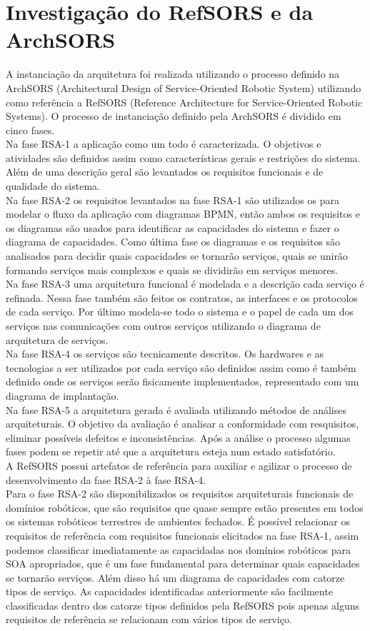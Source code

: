 \documentclass{article}
\begin{document}
\section{Investigação do RefSORS e da ArchSORS}
A instanciação da arquitetura foi realizada utilizando o processo definido na ArchSORS (Architectural Design of Service-Oriented Robotic System) utilizando como referência a RefSORS (Reference Architecture for Service-Oriented Robotic Systems). O processo de instanciação definido pela ArchSORS é dividido em cinco fases.\\
Na fase RSA-1 a aplicação como um todo é caracterizada. O objetivos e atividades são definidos assim como características gerais e restrições do sistema. Além de uma descrição geral são levantados os requisitos funcionais e de qualidade do sistema.\\
Na fase RSA-2 os requisitos levantados na fase RSA-1 são utilizados os para modelar o fluxo da aplicação com diagramas BPMN, então ambos os requisitos e os diagramas são usados para identificar as capacidades do sistema e fazer o diagrama de capacidades. Como última fase os diagramas e os requisitos são analisados para decidir quais capacidades se tornarão serviços, quais se unirão formando serviços mais complexos e quais se dividirão em serviços menores.\\
Na fase RSA-3 uma arquitetura funcional é modelada e a descrição cada serviço é refinada. Nessa fase também são feitos os contratos, as interfaces e os protocolos de cada serviço. Por último modela-se todo o sistema e o papel de cada um dos serviços nas comunicações com outros serviços utilizando o diagrama de arquitetura de serviços.\\
Na fase RSA-4 os serviços são tecnicamente descritos. Os hardwares e as tecnologias a ser utilizados por cada serviço são definidos assim como é também definido onde os serviços serão fisicamente implementados, representado com um diagrama de implantação.\\
Na fase RSA-5 a arquitetura gerada é avaliada utilizando métodos de análises arquiteturais. O objetivo da avaliação é analisar a conformidade com resquisitos, eliminar possíveis defeitos e inconsistências. Após a análise o processo algumas fases podem se repetir até que a arquitetura esteja num estado satisfatório.\\
A RefSORS possui artefatos de referência para auxiliar e agilizar o processo de desenvolvimento da fase RSA-2 à fase RSA-4.\\
Para o fase RSA-2 são disponibilizados os requisitos arquiteturais funcionais de domínios robóticos, que são requisitos que quase sempre estão presentes em todos os sistemas robóticos terrestres de ambientes fechados. É possível relacionar os requisitos de referência com requisitos funcionais elicitados na fase RSA-1, assim podemos classificar imediatamente as capacidadas nos domínios robóticos para SOA apropriados, que é um fase fundamental para determinar quais capacidades se tornarão serviços. Além disso há um diagrama de capacidades com catorze tipos de serviço. As capacidades identificadas anteriormente são facilmente classificadas dentro dos catorze tipos definidos pela RefSORS pois apenas alguns requisitos de referência se relacionam com vários tipos de serviço.\\
\end{document}
